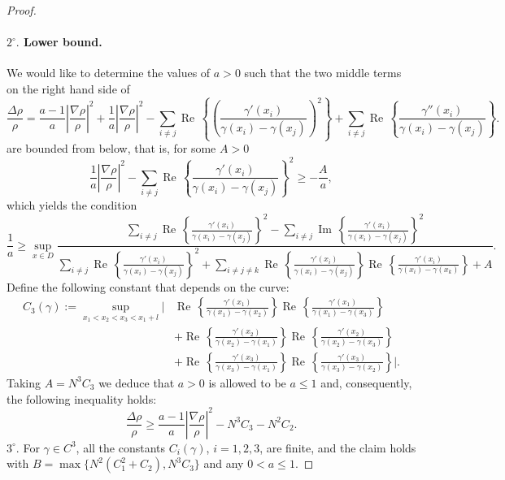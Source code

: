 \documentclass[11pt]{article}
\renewcommand{\Re}{\operatorname{Re}\,}
\renewcommand{\Im}{\operatorname{Im}\,}
\numberwithin{equation}{section}
\theoremstyle{definition}
\begin{document}
\begin{proof}
\paragraph{$2^{\circ}.$ Lower bound.} We would like to determine the values of $a>0$ such that the two middle terms on the right hand side of 
\[
    \frac{\Delta\rho}{\rho} 
    =\frac{a-1}{a}\left|\frac{\nabla\rho}{\rho}\right|^2 
    + \frac{1}{a}\left|\frac{\nabla\rho}{\rho}\right|^2 
    - \sum\limits_{i\neq j}\Re\left\{\left(\frac{\gamma'(x_{i})}{\gamma(x_{i})-\gamma(x_{j})}\right)^{2}\right\} 
    +\sum\limits_{i\neq j}\Re\left\{\frac{\gamma''(x_{i})}{\gamma(x_{i})-\gamma(x_{j})} \right\}.
\]
are bounded from below, that is, for some $A>0$ 
\[
    \frac{1}{a}\left|\frac{\nabla\rho}{\rho}\right|^2 
    - \sum\limits_{i\neq j}\Re\left\{\frac{\gamma'(x_{i})}{\gamma(x_{i})-\gamma(x_{j})}\right\}^{2} \ge -\frac{A}{a},
\]
which yields the condition 
\[
    \frac{1}{a}\ge \sup_{x\in D} \frac{\sum\limits_{i\neq j}\Re\left\{\frac{\gamma'(x_{i})}{\gamma(x_{i})-\gamma(x_{j})}\right\}^2-\sum\limits_{i\neq j}\Im\left\{\frac{\gamma'(x_{i})}{\gamma(x_{i})-\gamma(x_{j})}\right\}^2}{\sum\limits_{i\neq j}\Re\left\{\frac{\gamma'(x_{i})}{\gamma(x_{i})-\gamma(x_{j})}\right\}^2 + \sum\limits_{i\neq j\neq k}\Re\left\{\frac{\gamma'(x_{i})}{\gamma(x_{i})-\gamma(x_{j})}\right\}\Re\left\{\frac{\gamma'(x_{i})}{\gamma(x_{i})-\gamma(x_{k})}\right\}  + A}.
\]
Define the following constant that depends on the curve:
\begin{align*}
    C_{3}(\gamma) 
    :=\sup\limits_{x_{1}<x_{2}<x_{3}<x_{1}+l}\Bigg|
    &\Re\left\{\frac{\gamma'(x_{1})}{\gamma(x_{1})-\gamma(x_{2})}\right\}\Re\left\{\frac{\gamma'(x_{1})}{\gamma(x_{1})-\gamma(x_{3})}\right\}\\
    &+\Re\left\{\frac{\gamma'(x_{2})}{\gamma(x_{2})-\gamma(x_{1})}\right\}\Re\left\{\frac{\gamma'(x_{2})}{\gamma(x_{2})-\gamma(x_{3})}\right\}\\
    &+\Re\left\{\frac{\gamma'(x_{3})}{\gamma(x_{3})-\gamma(x_{1})}\right\}\Re\left\{\frac{\gamma'(x_{3})}{\gamma(x_{3})-\gamma(x_{2})}\right\}\Bigg|.
\end{align*}
Taking $A=N^{3}C_{3}$ we deduce that $a>0$ is allowed to be $a\le 1$ and, consequently, the following inequality holds:
\[
    \frac{\Delta\rho}{\rho} 
    \ge \frac{a-1}{a}\left|\frac{\nabla\rho}{\rho}\right|^2
    - N^{3}C_{3} - N^{2}C_{2}.
\]
$3^{\circ}.$ For $\gamma\in C^{3}$, all the constants $C_{i}(\gamma)$, $i=1,2,3$, are finite, and the claim holds with $B = \max\{N^{2}(C_{1}^{2}+C_{2}),N^{3}C_{3}\}$ and any $0<a \le 1$.
\end{proof}
\end{document}
